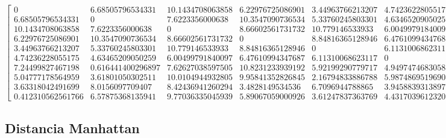 \documentclass[11pt]{article}
\begin{document}
    $\displaystyle \left[\begin{matrix}0 & 6.68505796534331 & 10.1434708063858 & 6.22976725086901 & 3.44963766213207 & 4.74236228055175 & 7.24499827467198 & 5.04777178564959 & 3.63318042491699 & 0.412310562561766\\6.68505796534331 & 0 & 7.6223356000638 & 10.3547090736534 & 5.33760245803301 & 4.63465209050259 & 0.616441400296897 & 3.61801050302511 & 8.0156097709407 & 6.57875368135941\\10.1434708063858 & 7.6223356000638 & 0 & 8.66602561731732 & 10.779146533933 & 6.00499791840097 & 7.62627038597505 & 10.0104944932805 & 8.42436941260294 & 9.77036335045939\\6.22976725086901 & 10.3547090736534 & 8.66602561731732 & 0 & 8.84816365128946 & 6.47610994347687 & 10.8231233939192 & 9.95841352826845 & 3.4828149534536 & 5.89067059000926\\3.44963766213207 & 5.33760245803301 & 10.779146533933 & 8.84816365128946 & 0 & 6.11310068623117 & 5.92199290779717 & 2.16794833886788 & 6.7096944788865 & 3.61247837363769\\4.74236228055175 & 4.63465209050259 & 6.00499791840097 & 6.47610994347687 & 6.11310068623117 & 0 & 4.94974746830583 & 5.98748695196908 & 3.94588393138977 & 4.43170396123207\\7.24499827467198 & 0.616441400296897 & 7.62627038597505 & 10.8231233939192 & 5.92199290779717 & 4.94974746830583 & 0 & 4.15331193145904 & 8.4717176534632 & 7.13722635202219\\5.04777178564959 & 3.61801050302511 & 10.0104944932805 & 9.95841352826845 & 2.16794833886788 & 5.98748695196908 & 4.15331193145904 & 0 & 7.76916983982201 & 5.10783711564885\\3.63318042491699 & 8.0156097709407 & 8.42436941260294 & 3.4828149534536 & 6.7096944788865 & 3.94588393138977 & 8.4717176534632 & 7.76916983982201 & 0 & 3.29393381840012\\0.412310562561766 & 6.57875368135941 & 9.77036335045939 & 5.89067059000926 & 3.61247837363769 & 4.43170396123207 & 7.13722635202219 & 5.10783711564885 & 3.29393381840012 & 0\end{matrix}\right]$

    
    \hypertarget{distancia-manhattan}{%
\subsection{Distancia Manhattan}\label{distancia-manhattan}}
\end{document}
